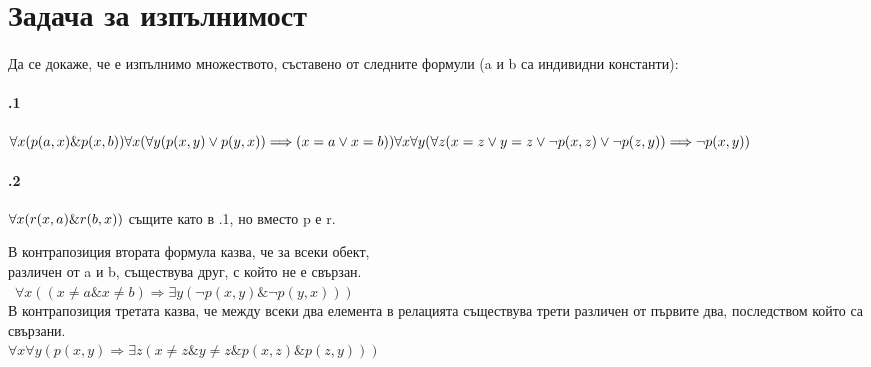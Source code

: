 \documentclass{article}
\begin{document}
\newpage
\section{Задача за изпълнимост}
\paragraph{}
Да се докаже, че е изпълнимо множеството, съставено от следните формули (a и b са индивидни константи): 
\paragraph{\hspace{0.5em} .1} 
\begin{addmargin}[1em]{2em}
$\forall x(p(a,x)\&p(x,b)) \\
\forall x( \forall y ( p(x, y)\lor p(y, x)) \Longrightarrow (x = a \lor x = b)) \\
\forall x \forall y ( \forall z (x = z \lor y = z \lor \neg p(x, z) \lor \neg p(z, y)) \Longrightarrow \neg p(x, y))$
\end{addmargin}

\vskip 0.2in

\paragraph{\hspace{0.5em} .2} 
\begin{addmargin}[1em]{2em}
$\forall x(r(x,a)\&r(b,x)) \\
$ същите като в .1, но вместо p е r.
\end{addmargin}
\begin{center}
В контрапозиция втората формула казва, че за всеки обект, \\ различен от a и b, съществува друг, с който не е свързан.  \\ \ $\forall x( (x \neq a \& x \neq b) \Longrightarrow \exists y ( \neg p(x, y)\& \neg p(y, x))  ) $ \\ В контрапозиция третата казва, че между всеки два елемента в релацията съществува трети различен от първите два, последством който са свързани. \\  $\forall x \forall y ( p(x, y) \Longrightarrow  \exists z (x \neq z \& y \neq z \&  p(x, z) \& p(z, y)) )$
\end{center}
\end{document}
